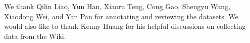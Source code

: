 \begin{ack}
We thank Qilin Liao, Yun Han, Xiaoru Teng, Cong Gao, Shengyu Wang, Xiaodong Wei, and Yan Pan for annotating and reviewing the datasets.
We would also like to thank Kenny Huang for his helpful discussions on collecting data from the \aops Wiki.
\end{ack}
